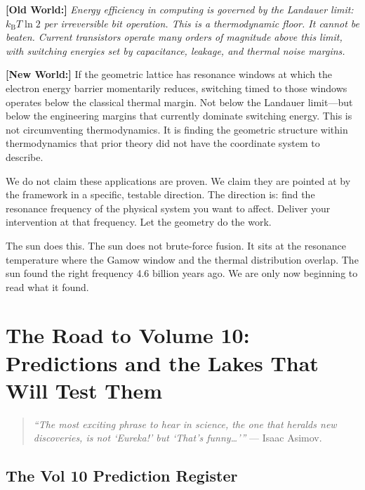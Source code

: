 \documentclass[11pt, letterpaper, openany]{book}
\newcommand{\oldworld}[1]{\noindent\textbf{\color{goldseal}[Old World:]} \textit{#1}\medskip}
\newcommand{\newworld}[1]{\noindent\textbf{\color{kishblue}[New World:]} #1\medskip}
\begin{document}
\oldworld{Energy efficiency in computing is governed by the Landauer limit:
$k_\text{B}T \ln 2$ per irreversible bit operation. This is a thermodynamic floor.
It cannot be beaten. Current transistors operate many orders of magnitude above
this limit, with switching energies set by capacitance, leakage, and thermal
noise margins.}

\newworld{If the geometric lattice has resonance windows at which the electron
energy barrier momentarily reduces, switching timed to those windows operates
below the classical thermal margin. Not below the Landauer limit---but below
the engineering margins that currently dominate switching energy. This is not
circumventing thermodynamics. It is finding the geometric structure within
thermodynamics that prior theory did not have the coordinate system to describe.}

We do not claim these applications are proven. We claim they are pointed at by
the framework in a specific, testable direction. The direction is: find the
resonance frequency of the physical system you want to affect. Deliver your
intervention at that frequency. Let the geometry do the work.

The sun does this. The sun does not brute-force fusion. It sits at the resonance
temperature where the Gamow window and the thermal distribution overlap. The sun
found the right frequency 4.6 billion years ago. We are only now beginning to
read what it found.

\clearpage

\chapter{The Road to Volume 10: Predictions and the Lakes That Will Test Them}

\begin{quote}
\textit{``The most exciting phrase to hear in science, the one that heralds
new discoveries, is not `Eureka!' but `That's funny\ldots'''} --- Isaac Asimov.
\end{quote}

\section{The Vol 10 Prediction Register}
\end{document}
